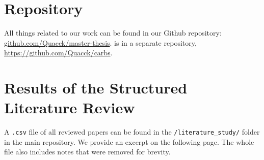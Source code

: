 \appendix
\thispagestyle{plain} %
\section{Repository} \label{appendix:repository}

All things related to our work can be found in our Github repository: \url{github.com/Quacck/master-thesis}.
\programname{} is in a separate repository, \url{https://github.com/Quacck/carbs}.

\section{Results of the Structured Literature Review} \label{appendix:literature_review_results}

A \verb|.csv| file of all reviewed papers can be found in the \verb|/literature_study/| folder in the main repository.
We provide an excerpt on the following page.
The whole file also includes notes that were removed for brevity.


